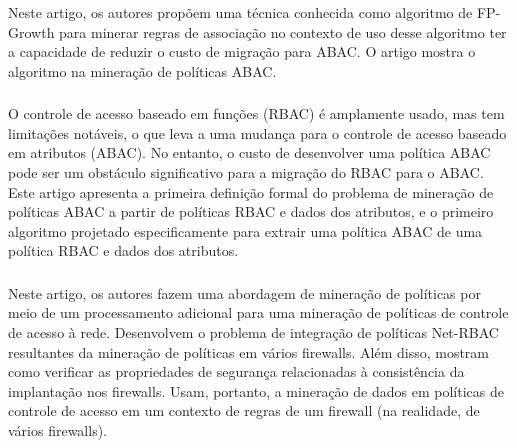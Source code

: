 \subsubsection{ }
Neste artigo, os autores propõem uma técnica conhecida como algoritmo de FP-Growth para minerar regras de associação no contexto de uso desse algoritmo ter a capacidade de reduzir o custo de migração para ABAC. O artigo mostra o algoritmo na mineração de políticas ABAC. 

\subsubsection{ }
O controle de acesso baseado em funções (RBAC) é amplamente usado, mas tem limitações notáveis, o que leva a uma mudança para o controle de acesso baseado em atributos (ABAC). No entanto, o custo de desenvolver uma política ABAC pode ser um obstáculo significativo para a migração do RBAC para o ABAC. Este artigo apresenta a primeira definição formal do problema de mineração de políticas ABAC a partir de políticas RBAC e dados dos atributos, e o primeiro algoritmo projetado especificamente para extrair uma política ABAC de uma política RBAC e dados dos atributos.

\subsubsection{ }
Neste artigo, os autores fazem uma abordagem de mineração de políticas por meio de um processamento adicional para uma mineração de políticas de controle de acesso à rede. Desenvolvem o problema de integração de políticas Net-RBAC resultantes da mineração de políticas em vários firewalls. Além disso, mostram como verificar as propriedades de segurança relacionadas à consistência da implantação nos firewalls. Usam, portanto, a mineração de dados em políticas de controle de acesso em um contexto de regras de um firewall (na realidade, de vários firewalls).

